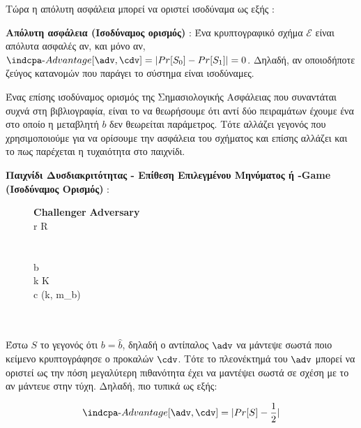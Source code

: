 Τώρα η απόλυτη ασφάλεια μπορεί να οριστεί ισοδύναμα ως εξής :

\begin{definition}
\label{def:perfect_security_1}
\textbf{Απόλυτη ασφάλεια (Ισοδύναμος ορισμός)} : Ένα κρυπτογραφικό σχήμα $\mathcal{E}$ είναι απόλυτα ασφαλές αν, και μόνο αν, $\indcpa\text{-}Advantage[\adv, \cdv] = | Pr[S_0] - Pr[S_1] | = 0$. Δηλαδή, αν οποιοδήποτε ζεύγος κατανομών που παράγει το σύστημα είναι ισοδύναμες.
\end{definition}

Ένας επίσης ισοδύναμος ορισμός της Σημασιολογικής Ασφάλειας που συναντάται συχνά στη βιβλιογραφία, είναι το να θεωρήσουμε ότι αντί δύο πειραμάτων έχουμε ένα στο οποίο η μεταβλητή $b$ δεν θεωρείται παράμετρος. Τότε αλλάζει γεγονός που χρησιμοποιούμε για να ορίσουμε την ασφάλεια του σχήματος και επίσης αλλάζει και το πως παρέχεται η τυχαιότητα στο παιχνίδι.

\begin{definition}
\textbf{Παιχνίδι Δυσδιακριτότητας - Επίθεση Επιλεγμένου Μηνύματος ή \indcpa-Game (Ισοδύναμος Ορισμός)} : 
\begin{figure}[H]
\begin{pchstack}
     {
    \textbf{Challenger \cdv} \< \< \textbf{Adversary \adv} \\
    r \sample R \< \< \\
    \<  \< \\
    \<  \< \\
    b \sample \bin \< \< \\
    k \sample K \< \< \\
    c \sample \enc(k, m_b) \< \< \\
    \<  \< \\
    \< \\
    }
\end{pchstack}
\label{def:indcpa_game_2}
\end{figure}

Έστω $S$ το γεγονός ότι $b = \hat{b}$, δηλαδή ο αντίπαλος $\adv$ να μάντεψε σωστά ποιο κείμενο κρυπτογράφησε ο προκαλών $\cdv$. Τότε το πλεονέκτημά του $\adv$ μπορεί να οριστεί ως την πόση μεγαλύτερη πιθανότητα έχει να μαντέψει σωστά σε σχέση με το αν μάντευε στην τύχη. Δηλαδή, πιο τυπικά ως εξής: 

\begin{equation}
    \indcpa\text{-}Advantage[\adv, \cdv] = | Pr[S] - \dfrac{1}{2} |
\end{equation}
\end{definition}

